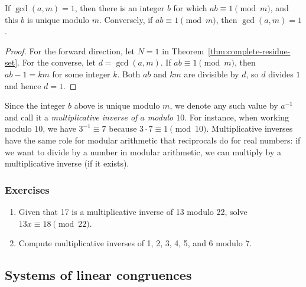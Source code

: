 \begin{corollary}\label{cor:invertible-mod-m}
If $\gcd(a,m) = 1$, then there is an integer $b$ for which $ab\equiv 1\pmod{m}$, and this $b$ is unique modulo $m$. Conversely, if $ab\equiv 1\pmod{m}$, then $\gcd(a,m) = 1$.
\end{corollary}
\begin{proof}
For the forward direction, let $N = 1$ in Theorem~\ref{thm:complete-residue-set}. For the converse, let $d = \gcd(a,m)$. If $ab\equiv 1\pmod{m}$, then $ab - 1 = km$ for some integer $k$. Both $ab$ and $km$ are divisible by $d$, so $d$ divides $1$ and hence $d = 1$.
\end{proof}

Since the integer $b$ above is unique modulo $m$, we denote any such value by $a^{-1}$ and call it a \emph{multiplicative inverse of $a$ modulo $10$}. For instance, when working modulo $10$, we have $3^{-1}\equiv 7$ because $3\cdot 7\equiv 1\pmod{10}$. Multiplicative inverses have the same role for modular arithmetic that reciprocals do for real numbers: if we want to divide by a number in modular arithmetic, we can multiply by a multiplicative inverse (if it exists).

\subsubsection*{Exercises}

\begin{enumerate}
\item Given that 17 is a multiplicative inverse of 13 modulo 22, solve $13x\equiv 18\pmod{22}$.
\item Compute multiplicative inverses of 1, 2, 3, 4, 5, and 6 modulo 7.
\end{enumerate}


\subsection{Systems of linear congruences}

